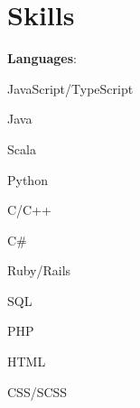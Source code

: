 \documentclass[showluaboxes=false]{resume}
\begin{document}
	\section{Skills}%
	\setlength{\columnsep}{1pc}%
	\setlength{\multicolsep}{0pt}%
	\begin{multicols}{3}%
		\textbf{Languages}:\\
			\begin{inlineseplist}%
				\item JavaScript/TypeScript
				\item Java
				\item Scala
				\item Python
				\item C/C++
				\item C\#
				\item Ruby/Rails
				\item SQL
				\item PHP
				\item HTML
				\item CSS/SCSS
			\end{inlineseplist}%

		\columnbreak


\end{multicols}
\end{document}
